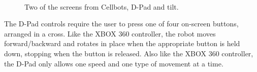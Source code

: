 \documentclass[12pt, letterpaper]{report}
\begin{document}
\begin{figure}
	~
	\caption{Two of the screens from Cellbots, D-Pad and tilt.}
	\label{cellbots}
\end{figure}

The D-Pad controls require the user to press one of four on-screen buttons, arranged in a cross. Like the XBOX 360 controller, the robot moves forward/backward and rotates in place when the appropriate button is held down, stopping when the button is released. Also like the XBOX 360 controller, the D-Pad only allows one speed and one type of movement at a time.
\end{document}

